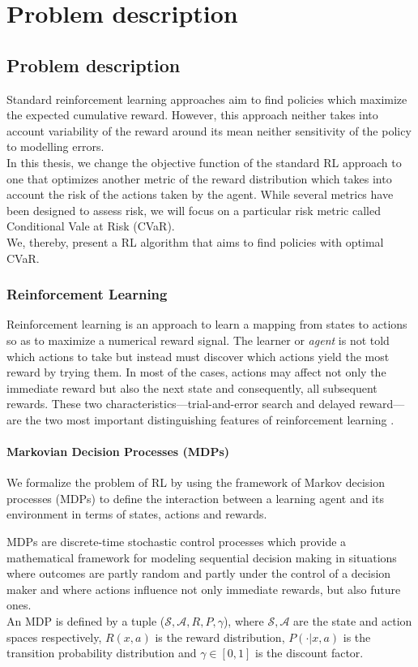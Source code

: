 \chapter{Problem description}
\label{sec:problem_description}
\section{Problem description}

Standard reinforcement learning approaches aim to find policies which maximize the expected cumulative reward.
However, this approach neither takes into account variability of the reward around its mean
neither sensitivity of the policy to modelling errors.\\
In this thesis, we change the objective function of the
standard RL approach to one that optimizes another metric of the reward distribution which
takes into account the risk of the actions taken by the agent.
While several metrics have been designed to assess risk, we will focus on a particular risk metric
called Conditional Vale at Risk (CVaR).\\
We, thereby, present a RL algorithm that aims to find policies with optimal CVaR.

\subsection{Reinforcement Learning}

Reinforcement learning is an approach to learn a mapping from states to actions so as to maximize 
a numerical reward signal. The learner or \textit{agent} is not told which actions to take
but instead must discover which actions yield the most reward by trying them. In most of the cases,
actions may affect not only the immediate reward but also the next state and consequently, all subsequent rewards.
These two characteristics—trial-and-error search and delayed reward—are the two most important
distinguishing features of reinforcement learning \citep{Sutton1998}.

\subsubsection{Markovian Decision Processes (MDPs)}
We formalize the problem of RL by using the framework of Markov decision processes (MDPs)
to define the interaction between a learning agent and its environment in terms of states,
actions and rewards.

MDPs  are discrete-time stochastic control processes which provide a
mathematical framework for modeling sequential decision making in situations where outcomes are
partly random and partly under the control of a decision maker and where actions influence not only immediate rewards,
but also future ones.\\
An MDP is defined by a tuple ($\mathcal{S,A},R,P,\gamma$), where $\mathcal{S,A}$ are the
state and action spaces respectively, $R(x,a)$ is the reward distribution, $P(\cdot |x,a)$ is
the transition probability distribution and $\gamma \in [0,1]$ is the discount factor. 

